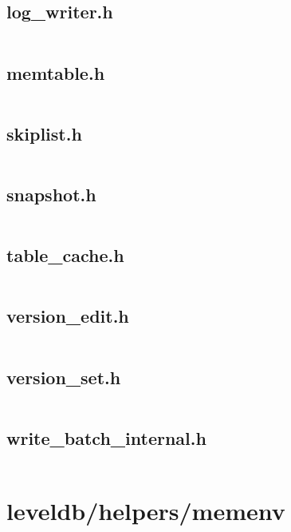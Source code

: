 \documentclass{article}
\begin{document}
\subsection{log\_writer.h}
\inputminted{cpp}{/home/dufferzafar/dev/@clones/bitcoin/src/leveldb/db/log_writer.h}
\newpage

\subsection{memtable.h}
\inputminted{cpp}{/home/dufferzafar/dev/@clones/bitcoin/src/leveldb/db/memtable.h}
\newpage

\subsection{skiplist.h}
\inputminted{cpp}{/home/dufferzafar/dev/@clones/bitcoin/src/leveldb/db/skiplist.h}
\newpage

\subsection{snapshot.h}
\inputminted{cpp}{/home/dufferzafar/dev/@clones/bitcoin/src/leveldb/db/snapshot.h}
\newpage

\subsection{table\_cache.h}
\inputminted{cpp}{/home/dufferzafar/dev/@clones/bitcoin/src/leveldb/db/table_cache.h}
\newpage

\subsection{version\_edit.h}
\inputminted{cpp}{/home/dufferzafar/dev/@clones/bitcoin/src/leveldb/db/version_edit.h}
\newpage

\subsection{version\_set.h}
\inputminted{cpp}{/home/dufferzafar/dev/@clones/bitcoin/src/leveldb/db/version_set.h}
\newpage

\subsection{write\_batch\_internal.h}
\inputminted{cpp}{/home/dufferzafar/dev/@clones/bitcoin/src/leveldb/db/write_batch_internal.h}
\newpage

\section{leveldb/helpers/memenv}
\end{document}
